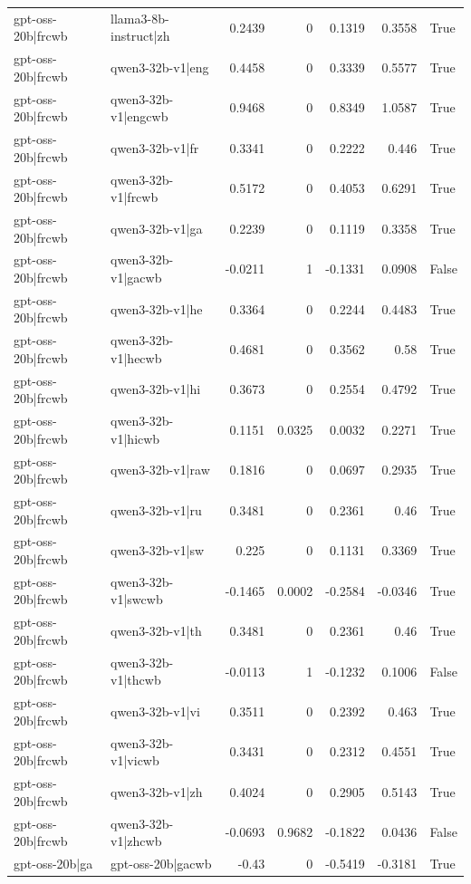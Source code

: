 \begin{table}
\begin{tabular}{l l r r r r l}
gpt-oss-20b|frcwb & llama3-8b-instruct|zh & 0.2439 & 0 & 0.1319 & 0.3558 & True \\
gpt-oss-20b|frcwb & qwen3-32b-v1|eng & 0.4458 & 0 & 0.3339 & 0.5577 & True \\
gpt-oss-20b|frcwb & qwen3-32b-v1|engcwb & 0.9468 & 0 & 0.8349 & 1.0587 & True \\
gpt-oss-20b|frcwb & qwen3-32b-v1|fr & 0.3341 & 0 & 0.2222 & 0.446 & True \\
gpt-oss-20b|frcwb & qwen3-32b-v1|frcwb & 0.5172 & 0 & 0.4053 & 0.6291 & True \\
gpt-oss-20b|frcwb & qwen3-32b-v1|ga & 0.2239 & 0 & 0.1119 & 0.3358 & True \\
gpt-oss-20b|frcwb & qwen3-32b-v1|gacwb & -0.0211 & 1 & -0.1331 & 0.0908 & False \\
gpt-oss-20b|frcwb & qwen3-32b-v1|he & 0.3364 & 0 & 0.2244 & 0.4483 & True \\
gpt-oss-20b|frcwb & qwen3-32b-v1|hecwb & 0.4681 & 0 & 0.3562 & 0.58 & True \\
gpt-oss-20b|frcwb & qwen3-32b-v1|hi & 0.3673 & 0 & 0.2554 & 0.4792 & True \\
gpt-oss-20b|frcwb & qwen3-32b-v1|hicwb & 0.1151 & 0.0325 & 0.0032 & 0.2271 & True \\
gpt-oss-20b|frcwb & qwen3-32b-v1|raw & 0.1816 & 0 & 0.0697 & 0.2935 & True \\
gpt-oss-20b|frcwb & qwen3-32b-v1|ru & 0.3481 & 0 & 0.2361 & 0.46 & True \\
gpt-oss-20b|frcwb & qwen3-32b-v1|sw & 0.225 & 0 & 0.1131 & 0.3369 & True \\
gpt-oss-20b|frcwb & qwen3-32b-v1|swcwb & -0.1465 & 0.0002 & -0.2584 & -0.0346 & True \\
gpt-oss-20b|frcwb & qwen3-32b-v1|th & 0.3481 & 0 & 0.2361 & 0.46 & True \\
gpt-oss-20b|frcwb & qwen3-32b-v1|thcwb & -0.0113 & 1 & -0.1232 & 0.1006 & False \\
gpt-oss-20b|frcwb & qwen3-32b-v1|vi & 0.3511 & 0 & 0.2392 & 0.463 & True \\
gpt-oss-20b|frcwb & qwen3-32b-v1|vicwb & 0.3431 & 0 & 0.2312 & 0.4551 & True \\
gpt-oss-20b|frcwb & qwen3-32b-v1|zh & 0.4024 & 0 & 0.2905 & 0.5143 & True \\
gpt-oss-20b|frcwb & qwen3-32b-v1|zhcwb & -0.0693 & 0.9682 & -0.1822 & 0.0436 & False \\
gpt-oss-20b|ga & gpt-oss-20b|gacwb & -0.43 & 0 & -0.5419 & -0.3181 & True \\

\end{tabular}
\end{table}
